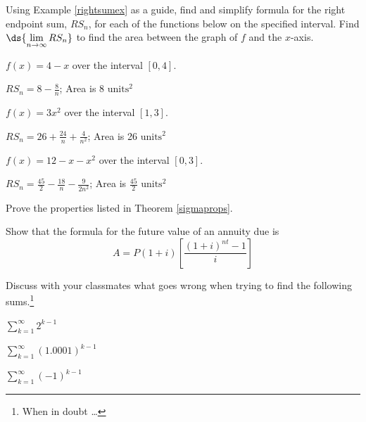 \documentclass{ximera}
\begin{document}
\begin{question}
Using Example \ref{rightsumex} as a guide, find and simplify  formula for the right endpoint sum, $RS_{n}$, for each of the functions below on the specified interval.  Find $\ds{\lim_{n \rightarrow \infty} RS_{n}}$ to find the area between the graph of $f$ and the $x$-axis.

\begin{problem}
    $f(x) = 4-x$ over the interval $[0,4]$.   

\begin{solution}
$RS_{n} = 8 - \frac{8}{n}$;  Area is 8 $\text{units}^2$
\end{solution}
\end{problem}

\begin{problem}
    $f(x) = 3x^2$ over the interval $[1,3]$.    

\begin{solution}
$RS_{n} = 26 + \frac{24}{n} + \frac{4}{n^2}$;  Area is 26 $\text{units}^2$
\end{solution}
\end{problem}


\begin{problem}
    $f(x) = 12-x-x^2$ over the interval $[0,3]$.   

\begin{solution}
$RS_{n} = \frac{45}{2}  - \frac{18}{n} - \frac{9}{2n^2}$;     Area is $\frac{45}{2}$  $\text{units}^2$
\end{solution}
\end{problem}


\end{question} 

\begin{problem}
Prove the properties listed in Theorem \ref{sigmaprops}.   
\end{problem}

\begin{problem}
Show that the formula for the future value of an annuity due is \[A = P(1 + i)\left[\frac{(1 + i)^{nt} - 1}{i}\right]\]
\end{problem}

\begin{question}
Discuss with your classmates what goes wrong when trying to find the following sums.\footnote{When in doubt \ldots }

\begin{problem}
    $ { \sum_{k=1}^{\infty} 2^{k-1}}$
\end{problem}

\begin{problem}
    $ { \sum_{k=1}^{\infty} (1.0001)^{k-1}}$
\end{problem}

\begin{problem}
    $ { \sum_{k=1}^{\infty} (-1)^{k-1}}$
\end{problem}

\end{question}
\end{document}
